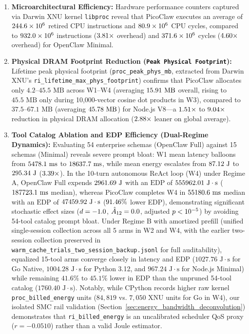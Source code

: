 \documentclass[preprint,12pt,3p]{elsarticle}
\begin{document}
\begin{enumerate}
    \item \textbf{Microarchitectural Efficiency:} Hardware performance counters captured via Darwin XNU kernel \texttt{libproc} reveal that PicoClaw executes an average of $244.6 \times 10^6$ retired CPU instructions and $80.9 \times 10^6$ CPU cycles, compared to $932.0 \times 10^6$ instructions ($3.81\times$ overhead) and $371.6 \times 10^6$ cycles ($4.60\times$ overhead) for OpenClaw Minimal.
    \item \textbf{Physical DRAM Footprint Reduction (\texttt{Peak Physical Footprint}):} Lifetime peak physical footprint (\texttt{proc\_peak\_phys\_mb}, extracted from Darwin XNU's \texttt{ri\_lifetime\_max\_phys\_footprint}) confirms that PicoClaw allocates only $4.2\text{--}45.5\text{ MB}$ across W1--W4 (averaging $15.91\text{ MB}$ overall, rising to $45.5\text{ MB}$ only during 10,000-vector cosine dot products in W3), compared to $37.5\text{--}67.1\text{ MB}$ (averaging $45.78\text{ MB}$) for Node.js V8---a $1.51\times$ to $9.04\times$ reduction in physical DRAM allocation ($2.88\times$ leaner on global average).
    \item \textbf{Tool Catalog Ablation and EDP Efficiency (Dual-Regime Dynamics):} Evaluating 54 enterprise schemas (OpenClaw Full) against 15 schemas (Minimal) reveals severe prompt bloat: W1 mean latency balloons from $5478.1\text{ ms}$ to $18637.7\text{ ms}$, while mean energy escalates from $87.12\text{ J}$ to $295.34\text{ J}$ ($3.39\times$). In the 10-turn autonomous ReAct loop (W4) under Regime A, OpenClaw Full expends $2961.69\text{ J}$ with an $\text{EDP}$ of $555962.01\text{ J}\cdot\text{s}$ ($187723.1\text{ ms}$ median), whereas PicoClaw completes W4 in $55180.6\text{ ms}$ median with an $\text{EDP}$ of $47459.92\text{ J}\cdot\text{s}$ ($91.46\%$ lower EDP), demonstrating significant stochastic effect sizes ($d = -1.0$, $\hat{A}_{12} = 0.0$, adjusted $p < 10^{-5}$) by avoiding 54-tool catalog prompt bloat. Under Regime B with amortized prefill (unified single-session collection across all 5 arms in W2 and W4, with the earlier two-session collection preserved in \texttt{warm\_cache\_trials\_two\_session\_backup.jsonl} for full auditability), equalized 15-tool arms converge closely in latency and EDP ($1027.76\text{ J}\cdot\text{s}$ for Go Native, $1004.28\text{ J}\cdot\text{s}$ for Python 3.12, and $967.24\text{ J}\cdot\text{s}$ for Node.js Minimal) while remaining $41.6\%\text{ to }45.1\%$ lower in EDP than the unpruned 54-tool catalog ($1760.40\text{ J}\cdot\text{s}$). Notably, while CPython records higher raw kernel \texttt{proc\_billed\_energy} units ($84{,}819$ vs. $7{,}050$ XNU units for Go in W4), our isolated SMC rail validation (Section~\ref{sec:energy_bandwidth_deconvolution}) demonstrates that \texttt{ri\_billed\_energy} is an uncalibrated scheduler QoS proxy ($r = -0.0510$) rather than a valid Joule estimator.
\end{enumerate}
\end{document}
